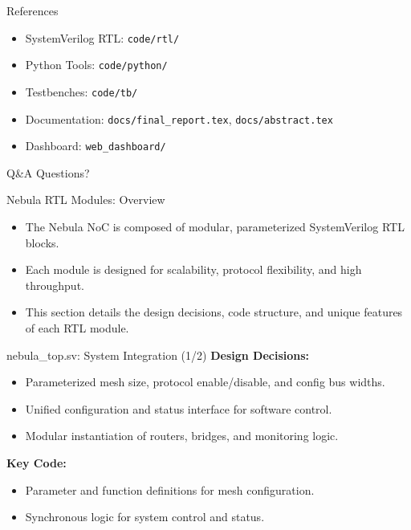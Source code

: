 \documentclass{beamer}
\begin{document}
\begin{frame}{References}
  \begin{itemize}
    \item SystemVerilog RTL: \texttt{code/rtl/}
    \item Python Tools: \texttt{code/python/}
    \item Testbenches: \texttt{code/tb/}
    \item Documentation: \texttt{docs/final\_report.tex}, \texttt{docs/abstract.tex}
    \item Dashboard: \texttt{web\_dashboard/}
  \end{itemize}
\end{frame}

\begin{frame}{Q\&A}
  \centering
  \Huge Questions?
\end{frame}

\begin{frame}{Nebula RTL Modules: Overview}
  \begin{itemize}
    \item The Nebula NoC is composed of modular, parameterized SystemVerilog RTL blocks.
    \item Each module is designed for scalability, protocol flexibility, and high throughput.
    \item This section details the design decisions, code structure, and unique features of each RTL module.
  \end{itemize}
\end{frame}

\begin{frame}{nebula\_top.sv: System Integration (1/2)}
  \textbf{Design Decisions:}
  \begin{itemize}
    \item Parameterized mesh size, protocol enable/disable, and config bus widths.
    \item Unified configuration and status interface for software control.
    \item Modular instantiation of routers, bridges, and monitoring logic.
  \end{itemize}
  \textbf{Key Code:}
  \begin{itemize}
    \item Parameter and function definitions for mesh configuration.
    \item Synchronous logic for system control and status.
  \end{itemize}
\end{frame}
\end{document}
